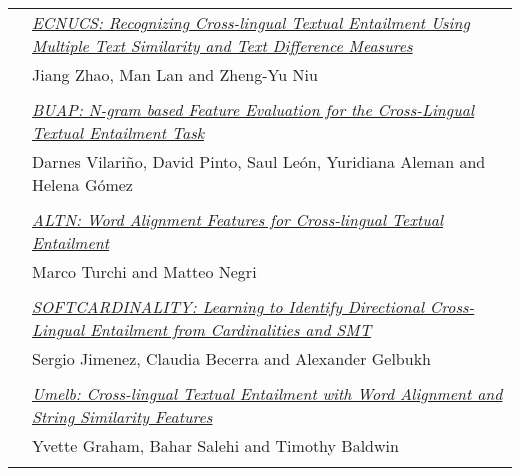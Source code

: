 \begin{tabular}{p{20mm}p{138mm}}
 & \hyperlink{page.118}{\em ECNUCS: Recognizing Cross-lingual Textual Entailment Using Multiple Text Similarity and Text Difference Measures}\\
         & Jiang Zhao, Man Lan and Zheng-Yu Niu \\
\\

 & \hyperlink{page.124}{\em BUAP: N-gram based Feature Evaluation for the Cross-Lingual Textual Entailment Task}\\
         & Darnes Vilari\~{n}o, David Pinto, Saul Le\'{o}n, Yuridiana Aleman and Helena G\'{o}mez \\
\\

 & \hyperlink{page.128}{\em ALTN: Word Alignment Features for Cross-lingual Textual Entailment}\\
         & Marco Turchi and Matteo Negri \\
\\

& \hyperlink{page.34}{\em SOFTCARDINALITY: Learning to Identify Directional Cross-Lingual Entailment from Cardinalities and SMT}\\
         & Sergio Jimenez, Claudia Becerra and Alexander Gelbukh \\
\\


 & \hyperlink{page.133}{\em Umelb: Cross-lingual Textual Entailment with Word Alignment and String Similarity Features}\\
         & Yvette Graham, Bahar Salehi and Timothy Baldwin \\
\\

\end{tabular}
\newpage

